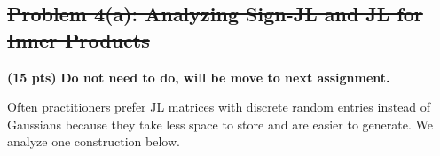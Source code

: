 \documentclass[10pt]{article}
\begin{document}


\subsection{\sout{Problem 4(a): Analyzing Sign-JL and JL for Inner Products}} 
\textbf{(15 pts)} \textbf{Do not need to do, will be move to next assignment.}

Often practitioners prefer JL matrices with discrete random entries instead of Gaussians because they take less space to store and are easier to generate. We  analyze one construction below.
\end{document}
